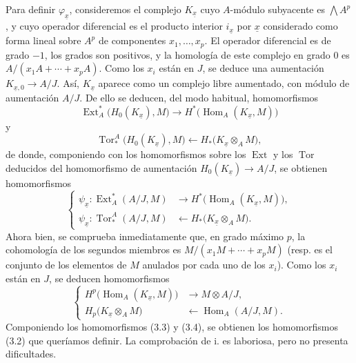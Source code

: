 Para definir $\varphi_{\underline{x}}$, consideremos el complejo
$K_{\underline{x}}$ cuyo $A$-módulo subyacente es $\bigwedge A^{p}$, y
cuyo operador diferencial es el producto interior $i_{\underline{x}}$ por
$\underline{x}$ considerado como forma lineal sobre $A^{p}$ de componentes
$x_1,\ldots,x_p$. El operador diferencial es de grado $-1$, los grados son
positivos, y la homología de este complejo en grado $0$ es
$A/(x_1A+\cdots+x_pA)$. Como los $x_i$ están en $J$, se deduce una
aumentación $K_{\underline{x},0}\longrightarrow A/J$. Así,
$K_{\underline{x}}$ aparece como un complejo libre aumentado, con módulo
de aumentación $A/J$. De ello se deducen, del modo habitual, homomorfismos
\[
\operatorname{Ext}_{A}^{*}\bigl(H_0(K_{\underline{x}}),M\bigr)
\longrightarrow
H^{*}\bigl(\operatorname{Hom}_{A}(K_{\underline{x}},M)\bigr)
\]
y
\[
\operatorname{Tor}_{*}^{A}\bigl(H_0(K_{\underline{x}}),M\bigr)
\longleftarrow
H_{*}\bigl(K_{\underline{x}}\otimes_A M\bigr),
\]
de donde, componiendo con los homomorfismos sobre los $\operatorname{Ext}$ y los
$\operatorname{Tor}$ deducidos del homomorfismo de aumentación
$H_0(K_{\underline{x}})\longrightarrow A/J$, se obtienen homomorfismos
\begin{equation}\tag{3.3}
\left\{
\begin{aligned}
\psi_{\underline{x}}:
\operatorname{Ext}_{A}^{*}(A/J,M)
&\longrightarrow H^{*}\bigl(\operatorname{Hom}_{A}(K_{\underline{x}},M)\bigr),\\
\psi_{\underline{x}}:
\operatorname{Tor}_{*}^{A}(A/J,M)
&\longleftarrow H_{*}\bigl(K_{\underline{x}}\otimes_A M\bigr).
\end{aligned}
\right.
\end{equation}
Ahora bien, se comprueba inmediatamente que, en grado máximo $p$, la cohomología de los segundos
miembros es $M/(x_1M+\cdots+x_pM)$ (resp. es el conjunto de los elementos de $M$
anulados por cada uno de los $x_i$). Como los $x_i$ están en $J$, se deducen
homomorfismos
\begin{equation}\tag{3.4}
\left\{
\begin{aligned}
H^{p}\bigl(\operatorname{Hom}_{A}(K_{\underline{x}},M)\bigr)
&\longrightarrow M\otimes A/J,\\
H_{p}\bigl(K_{\underline{x}}\otimes_A M\bigr)
&\longleftarrow\operatorname{Hom}_{A}(A/J,M).
\end{aligned}
\right.
\end{equation}
Componiendo los homomorfismos (3.3) y (3.4), se obtienen los homomorfismos (3.2)
que queríamos definir. La comprobación de i. es laboriosa, pero no
presenta dificultades.

